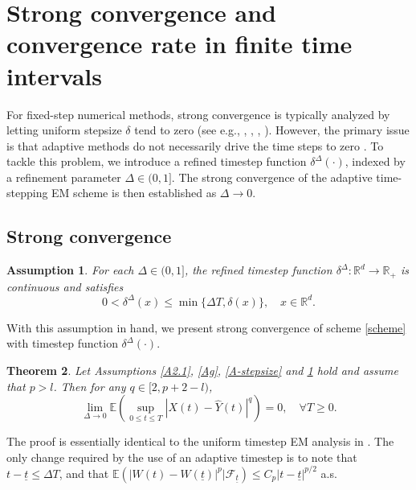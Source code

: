 \documentclass[preprint,12pt,compress]{elsarticle}
\newtheorem{theorem}{Theorem}[section] %
\newtheorem{assumption}[theorem]{Assumption}
\begin{document}

\section{Strong convergence and convergence rate in finite time intervals}  \label{sec4}

For fixed-step numerical methods, strong convergence is typically analyzed by letting uniform stepsize $\delta$ tend to zero (see e.g., \cite[Theorem 2.2]{higham2002strong}, \cite[Theorem 3.5]{mao2015the}, \cite[Theorem 1]{sabanis2016euler}, \cite[Theorem 3.3]{li2019explicit}). However, the primary issue is that adaptive methods do not necessarily drive the time steps to zero \cite{lamba2007an}. To tackle this problem, we introduce a refined timestep function $\delta^\Delta(\cdot)$, indexed by a refinement parameter $\Delta \in (0, 1]$. The strong convergence of the adaptive time-stepping EM scheme is then established as $\Delta \to 0$. 



\subsection{Strong convergence}
\begin{assumption}  \label{A-Delta}
	For each $\Delta \in (0,1]$, the refined timestep function ${\delta ^\Delta }:{\mathbb{R}^d} \to {\mathbb{R}_ + }$ is continuous and satisfies
	\begin{equation*}
		0 < {\delta ^\Delta }(x) \le \min \{ \Delta T,\delta (x)\} , \quad  x \in \mathbb{R}^d.
	\end{equation*}
\end{assumption}

With this assumption in hand, we present strong convergence of scheme \eqref{scheme} with timestep function $\delta^\Delta (\cdot)$.

\begin{theorem}  \label{th-convergence}
Let Assumptions \ref{A2.1}, \ref{Ag}, \ref{A-stepsize} and \ref{A-Delta} hold and assume that $p > l$. Then for any $q \in [2, p+2-l)$,
	\begin{equation*}
		\mathop {\lim }\limits_{\Delta  \to 0} \mathbb{E}\left( {\mathop {\sup }\limits_{0 \le t \le T} {{\left| {X(t) - \hat Y(t)} \right|}^q}} \right) = 0, \quad  \forall T \ge 0. 
	\end{equation*}
\end{theorem}
The proof is essentially identical to the uniform timestep EM analysis in \cite[Theorem 2.2]{higham2002strong}. The only change required by the use of an adaptive timestep is to note that 
$t- \underline{t} \le \Delta T$, and that $\mathbb{E}\left( {{{\left| {W(t) - W(\underline{t})} \right|}^p}}| \mathcal{F}_{\underline{t}} \right) \le {C_p}{\left| {t - \underline{t}} \right|^{p/2}}$  a.s.
\end{document}
